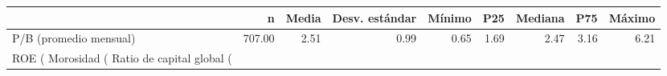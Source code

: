 \begin{tabular}{lrrrrrrrr}
\toprule
 & n & Media & Desv. estándar & Mínimo & P25 & Mediana & P75 & Máximo \\
\midrule
P/B (promedio mensual) & 707.00 & 2.51 & 0.99 & 0.65 & 1.69 & 2.47 & 3.16 & 6.21 \\
ROE (%
Morosidad (%
Ratio de capital global (%
\bottomrule
\end{tabular}
